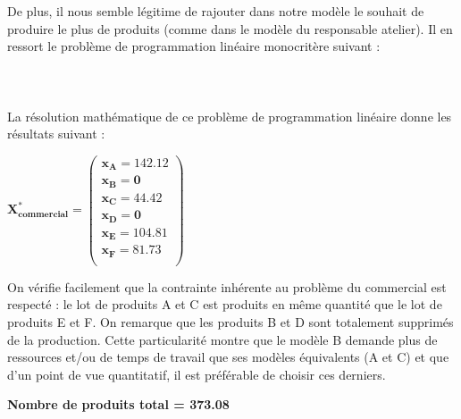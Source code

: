 \documentclass[12pt]{article}
\begin{document}
De plus, il nous semble légitime de rajouter dans notre modèle le souhait de produire le plus de produits (comme dans le modèle du responsable atelier).
Il en ressort le problème de programmation linéaire monocritère suivant :\\
\\
\noindent{}
\\
\\
La résolution mathématique de ce problème de programmation linéaire donne les résultats suivant :\\
\begin{center}
$\mathbf{X^{*}_{commercial} = 
   \left (
   \begin{array}{c}
      x_{A} = 142.12 \\
      x_{B} = 0 \\
      x_{C} = 44.42 \\
      x_{D} = 0 \\
      x_{E} = 104.81 \\
      x_{F} = 81.73 \\
   \end{array}
   \right )
 } $ 
\end{center}
On vérifie facilement que la contrainte inhérente au problème du commercial est respecté : le lot de produits A et C est produits en même quantité que le lot de produits E et F.
On remarque que les produits B et D sont totalement supprimés de la production. Cette particularité montre que le modèle B demande plus de ressources et/ou de temps de travail que ses modèles équivalents (A et C) et que d'un point de vue quantitatif, il est préférable de choisir ces derniers. 

\begin{center}
\textbf{Nombre de produits total = 373.08}
\end{center}
\end{document}
